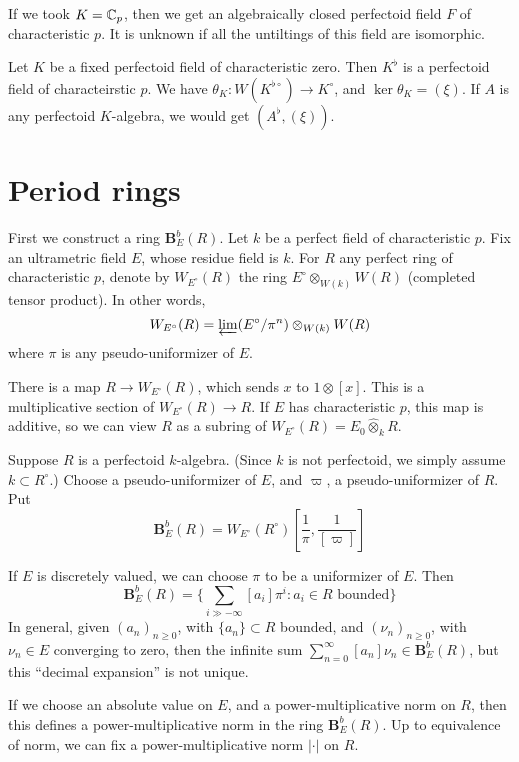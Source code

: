 \documentclass{article}
\begin{document}
If we took $K=\mathbb{C}_p$, then we get an algebraically closed perfectoid field 
$F$ of characteristic $p$. It is unknown if all the untiltings of this field 
are isomorphic. 

Let $K$ be a fixed perfectoid field of characteristic zero. Then $K^\flat$ is a 
perfectoid field of characteirstic $p$. We have $\theta_K:W(K^{\flat\circ}) \to K^\circ$, 
and $\ker\theta_K=(\xi)$. If $A$ is any perfectoid $K$-algebra, we would get 
$(A^\flat,(\xi))$. 





\section{Period rings}

First we construct a ring $\mathbf B_E^b(R)$. Let $k$ be a perfect field of 
characteristic $p$. Fix an ultrametric field $E$, whose residue field is $k$. 
For $R$ any perfect ring of characteristic $p$, denote by $W_{E^\circ}(R)$ the 
ring $E^\circ\otimes_{W(k)} W(R)$ (completed tensor product). In other words, 
\[
  W_{E^\circ}(R) = \varprojlim (E^\circ/\pi^n)\otimes_{W(k)} W(R)
\]
where $\pi$ is any pseudo-uniformizer of $E$. 

There is a map $R\to W_{E^\circ}(R)$, which sends $x$ to 
$1\otimes [x]$. This is a multiplicative section of 
$W_{E^\circ}(R) \to R$. If $E$ has characteristic $p$, this map is additive, so 
we can view $R$ as a subring of $W_{E^\circ}(R) = E_0\hat\otimes_k R$. 

Suppose $R$ is a perfectoid $k$-algebra. (Since $k$ is not perfectoid, we simply 
assume $k\subset R^\circ$.) Choose a pseudo-uniformizer of $E$, and $\varpi$, 
a pseudo-uniformizer of $R$. Put 
\[
  \mathbf B_E^b(R) = W_{E^\circ}(R^\circ)[\frac 1 \pi,\frac{1}{[\varpi]}]
\]

If $E$ is discretely valued, we can choose $\pi$ to be a uniformizer of $E$. 
Then 
\[
  \mathbf B_E^b(R) = \{\sum_{i\gg -\infty} [a_i] \pi^i: a_i\in R\text{ bounded}\}
\]
In general, given $(a_n)_{n\geqslant 0}$, with $\{a_n\}\subset R$ bounded, and 
$(\nu_n)_{n\geqslant 0}$, with $\nu_n\in E$ converging to zero, then the infinite sum 
$\sum_{n=0}^\infty [a_n] \nu_n \in \mathbf B_E^b(R)$, but this ``decimal expansion'' 
is not unique. 

If we choose an absolute value on $E$, and a power-multiplicative norm on 
$R$, then this defines a power-multiplicative norm in the ring $\mathbf B_E^b(R)$. 
Up to equivalence of norm, we can fix a power-multiplicative norm $|\cdot |$ on 
$R$. 
\end{document}
